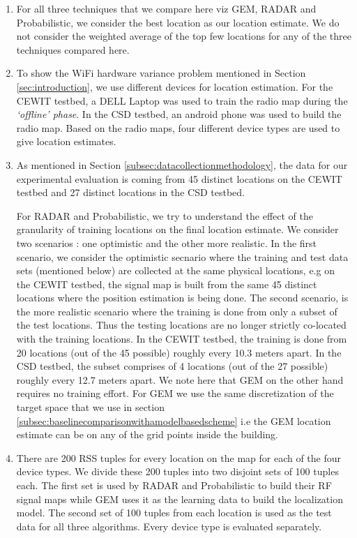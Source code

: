 \begin{enumerate}

\item 
For all three techniques that we compare here viz GEM, RADAR and Probabilistic, we consider the best location as our location estimate. We do not consider the weighted average of the top few locations for any of the three techniques compared here. 

\item
To show the WiFi hardware variance problem mentioned in Section \ref{sec:introduction}, we use different devices for location estimation. For the CEWIT testbed, a DELL Laptop was used to train the radio map during the {\it `offline' phase}. In the CSD testbed, an android phone was used to build the radio map. Based on the radio maps, four different device types are used to give location estimates. 

\item
As mentioned in Section \ref{subsec:datacollectionmethodology}, the data for our experimental evaluation is coming from 45 distinct locations on the CEWIT testbed and 27 distinct locations in the CSD testbed. 

For RADAR and Probabilistic, we try to understand the effect of the granularity of training locations on the final location estimate. We consider two scenarios : one optimistic and the other more realistic. In the first scenario, we consider the optimistic secnario where the training and test data sets (mentioned below) are collected at the same physical locations, e.g on the CEWIT testbed, the signal map is built from the same 45 distinct locations where the position estimation is being done. The second scenario, is the more realistic scenario where the training is done from only a subset of the test locations. Thus the testing locations are no longer strictly co-located with the training locations. In the CEWIT testbed, the training is done from 20 locations (out of the 45 possible) roughly every 10.3 meters apart. In the CSD testbed, the subset comprises of 4 locations (out of the 27 possible) roughly every 12.7 meters apart.  We note here that GEM on the other hand requires no training effort. For GEM we use the same discretization of the target space that we use in section \ref{subsec:baselinecomparisonwithamodelbasedscheme} i.e the GEM location estimate can be on any of the grid points inside the building.

\item
There are 200 RSS tuples for every location on the map for each of the four device types. We divide these 200 tuples into two disjoint sets of 100 tuples each. The first set is used by RADAR and Probabilistic to build their RF signal maps while GEM uses it as the learning data to build the localization model.  The second set of 100 tuples from each location is used as the test data for all three algorithms. Every device type is evaluated separately. 

\end{enumerate}

